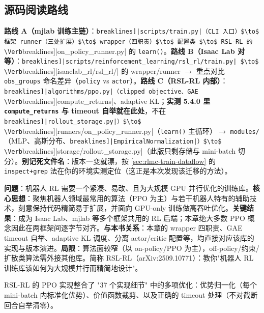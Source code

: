 \subsection{源码阅读路线}

\textbf{路线 A（mjlab 训练主链）}：\Verb[breaklines]|scripts/train.py|（CLI 入口）$\to$ 框架 runner（三处扩展）$\to$ wrapper（四职责）$\to$ 配置类 $\to$ RSL-RL 的 \Verb[breaklines]|on_policy_runner.py| 的 \verb|learn()|。\textbf{路线 B（Isaac Lab 对等）}：\Verb[breaklines]|scripts/reinforcement_learning/rsl_rl/train.py| $\to$ \Verb[breaklines]|isaaclab_rl/rsl_rl/| 的 wrapper/runner $\to$ 重点对比 \verb|obs_groups| 命名差异（\verb|policy| vs \verb|actor|）。\textbf{路线 C（RSL-RL 内部）}：\Verb[breaklines]|algorithms/ppo.py|（clipped objective、GAE \Verb[breaklines]|compute_returns|、adaptive KL；\textbf{实测 5.4.0 里 \texttt{compute\_returns} 与 timeout 自举就在此处}，不在 \Verb[breaklines]|rollout_storage.py|）$\to$ \Verb[breaklines]|runners/on_policy_runner.py|（\verb|learn()| 主循环）$\to$ \verb|modules/|（MLP、高斯分布、\Verb[breaklines]|EmpiricalNormalization|）$\to$ \Verb[breaklines]|storage/rollout_storage.py|（此版只剩存储与 mini-batch 切分）。\textbf{别记死文件名}：版本一变就漂，按 \cref{sec:rlmc-train-dataflow} 的 \texttt{inspect+grep} 法在你的环境实测定位（这正是本次发现该迁移的方法）。

\begin{paper}\label{paper:rlmc-rslrl}
\textbf{问题}：机器人 RL 需要一个紧凑、易改、且为大规模 GPU 并行优化的训练库。\textbf{核心思想}：聚焦机器人领域最常用的算法（PPO 为主）与若干机器人特有的辅助技术，刻意保持代码精简易于扩展，并面向 GPU-only 训练做高吞吐优化。\textbf{关键结果}：成为 Isaac Lab、mjlab 等多个框架共用的 RL 后端；本章绝大多数 PPO 概念因此在两框架间逐字节对齐。\textbf{与本书关系}：本章的 wrapper 四职责、GAE timeout 自举、adaptive KL 调度、分离 actor/critic 配置等，均直接对应该库的实现与版本演进。\textbf{局限}：算法面较窄（以 on-policy/PPO 为主），off-policy/约束/扩散类算法需外接其他库。简称 RSL-RL（arXiv:2509.10771）\cite{schwarke2025rslrl}：教你"机器人 RL 训练库该如何为大规模并行而精简地设计"。
\end{paper}

RSL-RL 的 PPO 实现整合了 "37 个实现细节" \cite{huang2022ppo37} 中的多项优化：优势归一化（每个 mini-batch 内标准化优势）、价值函数裁剪、以及正确的 timeout 处理（不对截断回合自举清零）。

